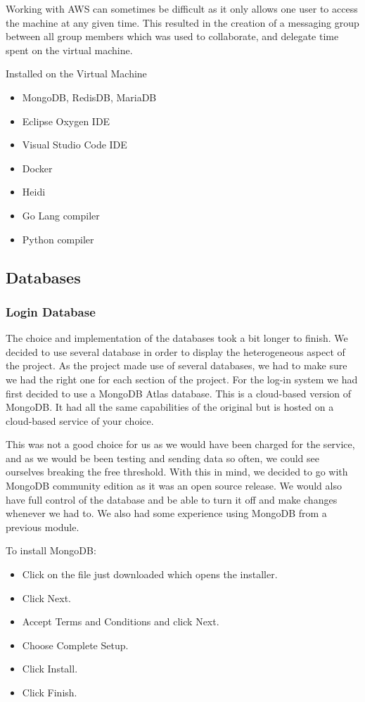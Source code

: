 Working with AWS can sometimes be difficult as it only allows one user to access the machine at any given time. This resulted in the creation of a messaging group between all group members which was used to collaborate, and delegate time spent on the virtual machine.
\cite{13214346620180901}

\newline

Installed on the Virtual Machine
\begin{itemize}
\item MongoDB, RedisDB, MariaDB
\item Eclipse Oxygen IDE
\item Visual Studio Code IDE
\item Docker
\item Heidi
\item Go Lang compiler
\item Python compiler
\end{itemize}

\subsection{Databases}
\subsubsection{Login Database}
The choice and implementation of the databases took a bit longer to finish. We decided to use several database in order to display the heterogeneous aspect of the project. As the project made use of several databases, we had to make sure we had the right one for each section of the project. For the log-in system we had first decided to use a MongoDB Atlas database. This is a cloud-based version of MongoDB. It had all the same capabilities of the original but is hosted on a cloud-based service of your choice.
\newline

This was not a good choice for us as we would have been charged for the service, and as we would be been testing and sending data so often, we could see ourselves breaking the free threshold. With this in mind, we decided to go with MongoDB community edition as it was an open source release. We would also have full control of the database and be able to turn it off and make changes whenever we had to. We also had some experience using MongoDB from a previous module.
\newline

To install MongoDB:
\begin{itemize}
\item Click on the file just downloaded which opens the installer.
\item Click Next.
\item Accept Terms and Conditions and click Next.
\item Choose Complete Setup.
\item Click Install.
\item Click Finish.
\end{itemize}
\newline

